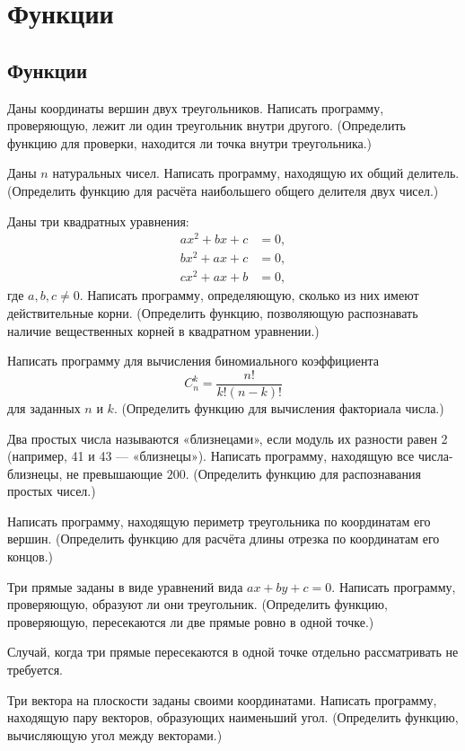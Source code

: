 \section{Функции}

\subsection{Функции}

\task Даны координаты вершин двух треугольников. Написать
программу, проверяющую, лежит ли один треугольник внутри другого.
(Определить функцию для проверки, находится ли точка внутри
треугольника.)

\task Даны $n$ натуральных чисел. Написать программу, находящую их
общий делитель. (Определить функцию для расчёта наибольшего общего
делителя двух чисел.)

\task Даны три квадратных уравнения:
\begin{align*}
a x^2 + b x + c &= 0,\\
b x^2 + a x + c &= 0,\\
c x^2 + a x + b &= 0,
\end{align*}
где $a,b,c\neq 0.$
Написать программу, определяющую, сколько из них имеют действительные
корни. (Определить функцию, позволяющую распознавать наличие
вещественных корней в квадратном уравнении.)

\task Написать программу для вычисления биномиального коэффициента
\[
C_n^k = \frac{n!}{k!(n-k)!}
\]
для заданных $n$ и $k.$ (Определить функцию для вычисления факториала
числа.)

\task Два простых числа называются «близнецами»,
если модуль их разности равен 2 (например, 41 и 43 —
«близнецы»). Написать программу, находящую все числа-близнецы, не
превышающие $200.$ (Определить функцию для распознавания простых
чисел.)

\task Написать программу, находящую периметр треугольника по
координатам его вершин. (Определить функцию для расчёта длины отрезка
по координатам его концов.)

\task Три прямые заданы в виде уравнений вида $ax+by+c=0.$ Написать
программу, проверяющую, образуют ли они треугольник. (Определить
функцию, проверяющую, пересекаются ли две прямые ровно в одной
точке.)

Случай, когда три прямые пересекаются в одной точке отдельно
рассматривать не требуется.

\task Три вектора на плоскости заданы своими координатами. Написать
программу, находящую пару векторов, образующих наименьший
угол. (Определить функцию, вычисляющую угол между векторами.)

